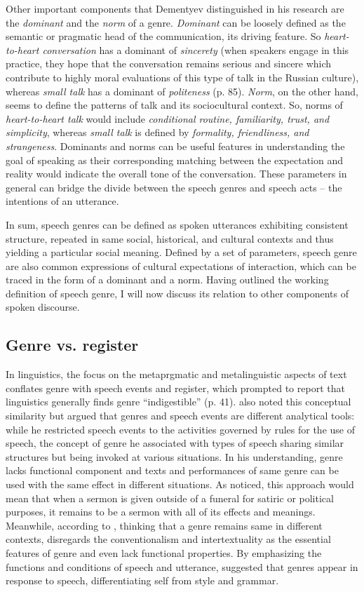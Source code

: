 \documentclass[12pt]{article}
\begin{document}
Other important components that Dementyev distinguished in his research are the \textit{dominant} and the \textit{norm} of a genre. \textit{Dominant} can be loosely defined as the semantic or pragmatic head of the communication, its driving feature. So \textit{heart-to-heart conversation} has a dominant of \textit{sincerety} (when speakers engage in this practice, they hope that the conversation remains serious and sincere which contribute to highly moral evaluations of this type of talk in the Russian culture), whereas \textit{small talk} has a dominant of \textit{politeness} (p. 85). \textit{Norm}, on the other hand, seems to define the patterns of talk and its sociocultural context. So, norms of \textit{heart-to-heart talk} would include \textit{conditional routine, familiarity, trust, and simplicity}, whereas \textit{small talk} is defined by \textit{formality, friendliness, and strangeness}. Dominants and norms can be useful features in understanding the goal of speaking as their corresponding matching between the expectation and reality would indicate the overall tone of the conversation. These parameters in general can bridge the divide between the speech genres and speech acts -- the intentions of an utterance. 

In sum, speech genres can be defined as spoken utterances exhibiting consistent structure, repeated in same social, historical, and cultural contexts and thus yielding a particular social meaning. Defined by a set of parameters, speech genre are also common expressions of cultural expectations of interaction, which can be traced in the form of a dominant and a norm. Having outlined the working definition of speech genre, I will now discuss its relation to other components of spoken discourse.
\subsection{Genre vs. register}
In linguistics, the focus on the metaprgmatic and metalinguistic aspects of text conflates genre with speech events and register, which prompted \textcite{swales1990} to report that linguistics generally finds genre ``indigestible'' (p. 41). \textcite{hymes1974} also noted this conceptual similarity but argued that genres and speech events are different analytical tools: while he restricted speech events to the activities governed by rules for the use of speech, the concept of genre he associated with types of speech sharing similar structures but being invoked at various situations. In his understanding, genre lacks functional component and texts and performances of same genre can be used with the same effect in different situations. As \textcite{swales1990} noticed, this approach would mean that when a sermon is given outside of a funeral for satiric or political purposes, it remains to be a sermon with all of its effects and meanings. Meanwhile, according to \textcite{bakhtin1986}, thinking that a genre remains same in different contexts, disregards the conventionalism and intertextuality as the essential features of genre and even lack functional properties. By emphasizing the functions and conditions of speech and utterance, \textcite{bakhtin1986} suggested that genres appear in response to speech, differentiating self from style and grammar.  
\end{document}
